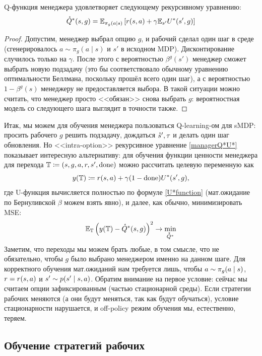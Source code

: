 \begin{proposition}\label{pr:managerQ*U*}
Q-функция менеджера удовлетворяет следующему рекурсивному уравнению:
\begin{equation}\label{managerQ*U*}
\accentset{\star}{Q}^*(s, g) = \mathbb{E}_{\pi_g(a \mid s)} \left[ r(s, a) + \gamma \mathbb{E}_{s'} U^*(s', g)\right]
\end{equation}
\begin{proof}
Допустим, менеджер выбрал опцию $g$, и рабочий сделал один шаг в среде (сгенерировалось $a \sim \pi_g(a \mid s)$ и $s'$ в исходном MDP). Дисконтирование случилось только на $\gamma$. После этого с вероятностью $\beta^g(s')$ менеджер сможет выбрать новую подзадачу (это бы соответствовало обычному уравнению оптимальности Беллмана, поскольку прошёл всего один шаг), а с вероятностью $1 - \beta^g(s)$ менеджеру не предоставляется выбора. В такой ситуации можно считать, что менеджер просто <<обязан>> снова выбрать $g$: вероятностная модель со следующего шага выглядит в точности также.
\end{proof}
\end{proposition}

Итак, мы можем для обучения менеджера пользоваться Q-learning-ом для sMDP: просить рабочего $g$ решить подзадачу, дождаться $\accentset{\star}{s}', \tau$ и делать один шаг обновления. Но <<intra-option>> рекурсивное уравнение \eqref{managerQ*U*} показывает интересную альтернативу: для обучения функции ценности менеджера для перехода $\mathbb{T} \coloneqq (s, g, a, r, s', \mathrm{done})$ можно рассчитать целевую переменную как
$$y(\mathbb{T}) \coloneqq r(s, a) + \gamma (1 - \mathrm{done}) U^*(s', g),$$
где U-функция вычисляется полностью по формуле \eqref{U*function} (мат.ожидание по Бернуливской $\beta$ можем взять явно), и далее, как обычно, минимизировать MSE:
$$\mathbb{E}_{\mathbb{T}} \left(y(\mathbb{T}) - \accentset{\star}{Q}^*(s, g)\right)^2 \to \min_{\accentset{\star}{Q}^*}$$
Заметим, что переходы мы можем брать любые, в том смысле, что не обязательно, чтобы $g$ было выбрано менеджером именно на данном шаге. Для корректного обучения мат.ожиданий нам требуется лишь, чтобы $a \HM\sim \pi_g(a \HM\mid s)$, $r \HM= r(s, a)$ и $s' \HM\sim p(s' \HM\mid s, a)$. Обратим внимание на первое условие: сейчас мы считаем опции зафиксированным (частью стационарной среды). Если стратегии рабочих меняются (а они будут меняться, так как будут обучаться), условие стационарности нарушается, и off-policy режим обучения мы, естественно, теряем. 

\subsection{Обучение стратегий рабочих}

